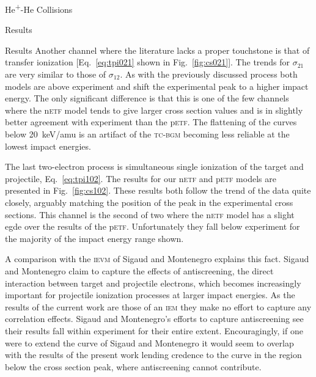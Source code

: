 \documentclass[letterpaper, 11 pt]{report}
\begin{document}
\begin{chapter}{\texorpdfstring{He\textsuperscript{+}}{He+}-He Collisions \label{chap:hephe}}
\begin{section}{Results \label{sec:hephe-disc}}
\begin{subsection}{Results \label{sec:hephe-res}}
         Another channel where the literature lacks a proper touchstone is that of transfer ionization
         [Eq.~\eqref{eq:tpi021} shown in Fig.~\ref{fig:cs021}]. The trends for $\sigma_{21}$ are very
         similar to those of $\sigma_{12}$. As with the previously discussed process both models are
         above experiment and shift the experimental peak to a higher impact energy. The only
         significant difference is that this is one of the few channels where the n\textsc{etf} model
         tends to give larger cross section values and is in slightly better agreement with experiment
         than the p\textsc{etf}. The flattening of the curves below 20~keV/amu is an artifact of the
         \textsc{tc-bgm} becoming less reliable at the lowest impact energies.

         The last two-electron process is simultaneous single ionization of the target and projectile,
         Eq.~\eqref{eq:tpi102}. The results for our n\textsc{etf} and p\textsc{etf} models are presented
         in Fig.~\ref{fig:cs102}. These results both follow the trend of the data quite closely,
         arguably matching the position of the peak in the experimental cross sections. This channel is
         the second of two where the n\textsc{etf} model has a slight egde over the results of the
         p\textsc{etf}. Unfortunately they fall below experiment for the majority of the impact energy
         range shown.

         A comparison with the \textsc{ievm} of Sigaud and Montenegro explains this fact. Sigaud and
         Montenegro claim to capture the effects of antiscreening, the direct interaction between target
         and projectile electrons, which becomes increasingly important for projectile ionization
         processes at larger impact energies. As the results of the current work are those of an
         \textsc{iem} they make no effort to capture any correlation effects. Sigaud and Montenegro's
         efforts to capture antiscreening see their results fall within experiment for their entire
         extent. Encouragingly, if one were to extend the curve of Sigaud and Montenegro it would seem
         to overlap with the results of the present work lending credence to the curve in the region
         below the cross section peak, where antiscreening cannot contribute.


\end{subsection}
\end{section}
\end{chapter}
\end{document}
